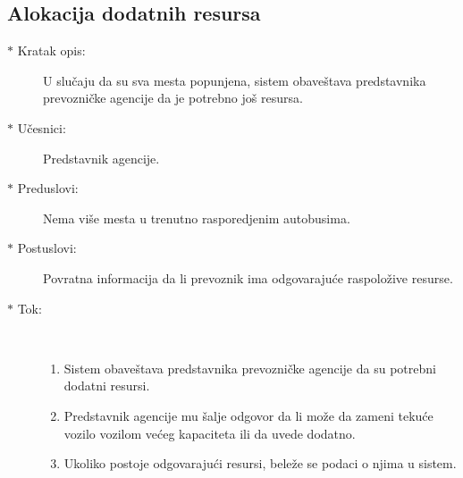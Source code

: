 \subsection{Alokacija dodatnih resursa}
\begin{description}
	\item[$\ast$ Kratak opis: ] U slu\v caju da su sva mesta popunjena, sistem obave\v stava predstavnika prevozni\v cke agencije da je potrebno jo\v s resursa. 
	\item[$\ast$ U\v cesnici: ] Predstavnik agencije.
	\item[$\ast$ Preduslovi: ] Nema vi\v se mesta u trenutno rasporedjenim autobusima.
	\item[$\ast$ Postuslovi: ] Povratna informacija da li prevoznik ima odgovaraju\'ce raspolo\v zive resurse.
	\item[$\ast$ Tok: ] \ \\
	\begin{enumerate}
		\item Sistem obave\v stava predstavnika prevozni\v cke agencije da su potrebni dodatni resursi.
		\item Predstavnik agencije mu \v salje odgovor da li mo\v ze da zameni teku\'ce vozilo vozilom ve\'ceg kapaciteta ili da uvede dodatno.
		\item Ukoliko postoje odgovaraju\'ci resursi, bele\v ze se podaci o njima u sistem.
	\end{enumerate}
\end{description}
